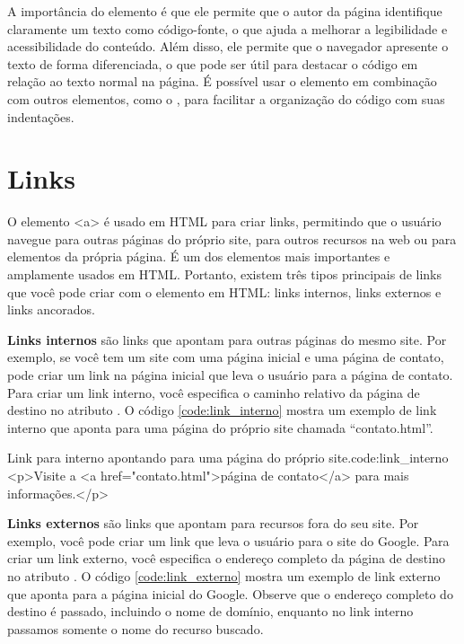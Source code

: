 A importância do elemento  é que ele permite que o autor da página identifique claramente um texto como código-fonte, o que ajuda a melhorar a legibilidade e acessibilidade do conteúdo. Além disso, ele permite que o navegador apresente o texto de forma diferenciada, o que pode ser útil para destacar o código em relação ao texto normal na página. É possível usar o elemento  em combinação com outros elementos, como o , para facilitar a organização do código com suas indentações.

\section{Links}

O elemento <a> é usado em HTML para criar links, permitindo que o usuário navegue para outras páginas do próprio site, para outros recursos na web ou para elementos da própria página. É um dos elementos mais importantes e amplamente usados em HTML. Portanto, existem três tipos principais de links que você pode criar com o elemento  em HTML: links internos, links externos e links ancorados.

\textbf{Links internos} são links que apontam para outras páginas do mesmo site. Por exemplo, se você tem um site com uma página inicial e uma página de contato, pode criar um link na página inicial que leva o usuário para a página de contato. Para criar um link interno, você especifica o caminho relativo da página de destino no atributo . O código \ref{code:link_interno} mostra um exemplo de link interno que aponta para uma página do próprio site chamada ``contato.html''. 

\begin{htmlcode}{Link para interno apontando para uma página do próprio site.}{code:link_interno}
<p>Visite a <a href="contato.html">página de contato</a> para mais informações.</p>
\end{htmlcode}

\textbf{Links externos} são links que apontam para recursos fora do seu site. Por exemplo, você pode criar um link que leva o usuário para o site do Google. Para criar um link externo, você especifica o endereço completo da página de destino no atributo . O código \ref{code:link_externo} mostra um exemplo de link externo que aponta para a página inicial do Google. Observe que o endereço completo do destino é passado, incluindo o nome de domínio, enquanto no link interno passamos somente o nome do recurso buscado.

